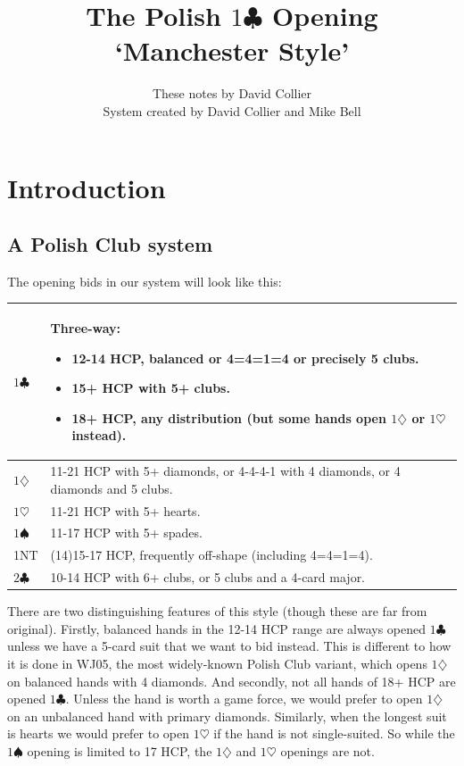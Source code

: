 \documentclass{article}
\newcommand{\sz}{\spadesuit}
\newcommand{\hz}{\heartsuit}
\newcommand{\dz}{\diamondsuit}
\newcommand{\cz}{\clubsuit}
\newcommand{\st}{\rule{0pt}{4mm}}
\begin{document}
\title{The Polish $1\cz$ Opening \\ `Manchester Style'}
\author{These notes by David Collier \\ System created by David Collier and Mike Bell}
\maketitle

\tableofcontents

\newpage
\section{Introduction}
\subsection{A Polish Club system}

The opening bids in our system will look like this:

\begin{center}
\begin{tabular}{|l|p{10cm}|} \hline
$1\cz$ & \st Three-way:
\begin{itemize}
\item 12-14 HCP, balanced or 4=4=1=4 or precisely 5 clubs.
\item 15+ HCP with 5+ clubs.
\item 18+ HCP, any distribution (but some hands open $1\diamondsuit$ or $1\hz$ instead).
\end{itemize} \\ \hline
$1\dz$ & \st 11-21 HCP with 5+ diamonds, or 4-4-4-1 with 4 diamonds, or 4 diamonds and 5 clubs. \\ \hline
$1\hz$ & \st 11-21 HCP with 5+ hearts. \\ \hline
$1\sz$ & \st 11-17 HCP with 5+ spades. \\ \hline
1NT & \st (14)15-17 HCP, frequently off-shape (including 4=4=1=4). \\ \hline
$2\cz$ & \st 10-14 HCP with 6+ clubs, or 5 clubs and a 4-card major. \\ \hline
\end{tabular}
\end{center}

\vspace{3mm}
There are two distinguishing features of this style (though these are far from original). Firstly, balanced hands in the 12-14 HCP range are always opened $1\cz$ unless we have a 5-card suit that we want to bid instead. This is different to how it is done in WJ05, the most widely-known Polish Club variant, which opens $1\dz$ on balanced hands with 4 diamonds. And secondly, not all hands of 18+ HCP are opened $1\cz$. Unless the hand is worth a game force, we would prefer to open $1\dz$ on an unbalanced hand with primary diamonds. Similarly, when the longest suit is hearts we would prefer to open $1\hz$ if the hand is not single-suited. So while the $1\sz$ opening is limited to 17 HCP, the $1\dz$ and $1\hz$ openings are not.
\end{document}
